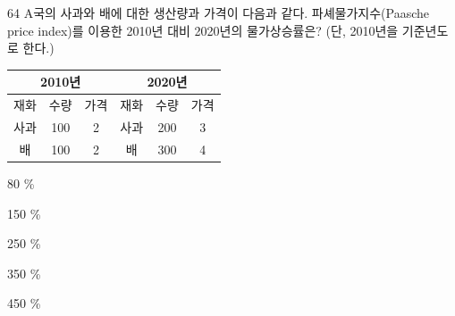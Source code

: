 \begin{question}{64}
A국의 사과와 배에 대한 생산량과 가격이 다음과 같다. 파셰물가지수(Paasche price index)를 이용한 2010년 대비 2020년의 물가상승률은? (단, 2010년을 기준년도로 한다.)

{\small\centering\renewcommand{\arraystretch}{1.3}
\begin{tabular}{|c|c|c|c|c|c|}\hline
\multicolumn{3}{|c|}{2010년} & \multicolumn{3}{c|}{2020년} \\ \hline
재화 & 수량 & 가격 & 재화 & 수량 & 가격 \\ \hline
사과 & 100 & 2 & 사과 & 200 & 3 \\ \hline
배 & 100 & 2 & 배 & 300 & 4 \\ \hline
\end{tabular}\par}
\begin{choices}
  \item 80 \%
  \item 150 \%
  \item 250 \%
  \item 350 \%
  \item 450 \%
\end{choices}
\end{question}
